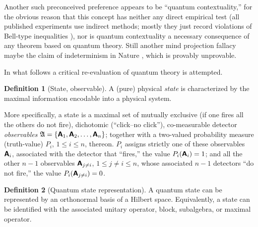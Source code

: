 \documentclass[%
  preprint,
 showpacs,
 showkeys,
 preprintnumbers,
 amsmath,amssymb,
 aps,
 prl,
  longbibliography,
 ]{revtex4-1}
\theoremstyle{definition}
\newtheorem{definition}{Definition}
\theoremstyle{remark}
\begin{document}
Another such preconceived preference appears to be ``quantum contextuality,''
for the obvious reason that this concept has neither any direct empirical test
(all published experiments use indirect methods; mostly they just record violations of Bell-type inequalities \cite{svozil:040102}),
nor is quantum contextuality a necessary consequence of any theorem based on quantum theory.
Still another mind projection fallacy maybe the claim of indeterminism in Nature \cite{born-26-1,born-26-2},
which is provably unprovable.

In what follows a critical re-evaluation of quantum theory
is attempted.

\begin{definition}[State, observable]
A (pure) physical {\em state} is characterized by the maximal information encodable into a physical system.

More specifically, a state is a maximal set of mutually exclusive
(if one fires all the others do not fire), dichotomic (``click--no click''),
co-measurable detector {\em observables}
${\frak A} =\{\textsf{\textbf{A}}_1,\textsf{\textbf{A}}_2,\ldots , \textsf{\textbf{A}}_n\}$;
together with a two-valued probability measure (truth-value) $P_i$, $1 \le i \le n$, thereon.
$P_i$ assigns
strictly one of these observables $\textsf{\textbf{A}}_i$,
associated with the detector
that ``fires,'' the value $P_i(\textsf{\textbf{A}}_i)=1$;
and all the other $n-1$ observables $\textsf{\textbf{A}}_{j\neq i}$, $1 \le j \neq i \le n$,
whose associated $n-1$ detectors ``do not fire,''  the value $P_i(\textsf{\textbf{A}}_{j\neq i})=0$.
\end{definition}

\begin{definition}[Quantum state representation]
A quantum state can be represented by an orthonormal basis of a Hilbert space.
Equivalently, a state can be identified with the associated unitary operator,
block, subalgebra, or maximal operator.
\end{definition}
\end{document}
